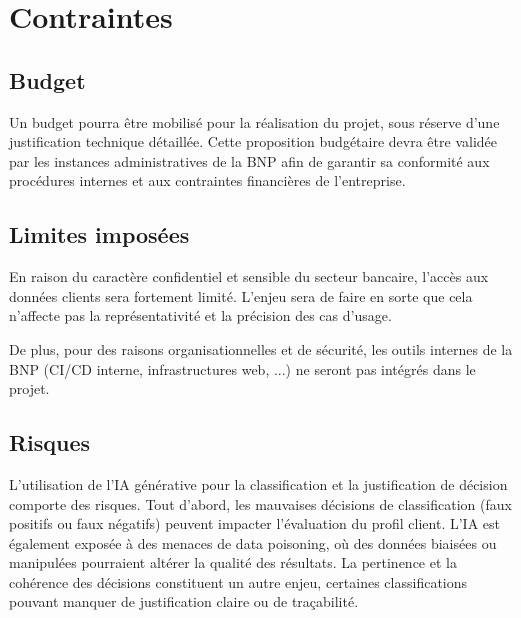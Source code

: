 \section{Contraintes}

\subsection{Budget}

Un budget pourra être mobilisé pour la réalisation du projet, sous réserve d'une justification technique détaillée.
Cette proposition budgétaire devra être validée par les instances administratives de la BNP afin
de garantir sa conformité aux procédures internes et aux contraintes financières de l'entreprise.

\subsection{Limites imposées}

En raison du caractère confidentiel et sensible du secteur bancaire, l'accès aux données clients sera fortement limité.
L'enjeu sera de faire en sorte que cela n'affecte pas la représentativité et la précision des cas d'usage.

De plus, pour des raisons organisationnelles et de sécurité, les outils internes de la BNP (CI/CD interne,
infrastructures web, ...) ne seront pas intégrés dans le projet.

\subsection{Risques}

L'utilisation de l'IA générative pour la classification et la justification de décision comporte des risques. Tout d'abord,
les mauvaises décisions de classification (faux positifs ou faux négatifs) peuvent impacter
l'évaluation du profil client. L’IA est également exposée à des menaces de data poisoning, où des données biaisées ou
manipulées pourraient altérer la qualité des résultats. La pertinence et la cohérence des décisions constituent un autre
enjeu, certaines classifications pouvant manquer de justification claire ou de traçabilité.

